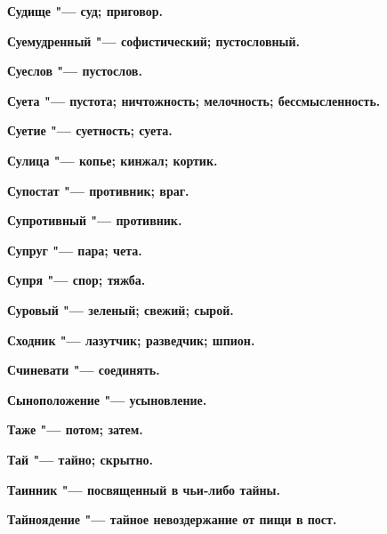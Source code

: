 \bfseries Судище \normalfont{} "--- суд; приговор. 




\bfseries Суемудренный \normalfont{} "--- софистический; пустословный. 




\bfseries Суеслов \normalfont{} "--- пустослов. 




\bfseries Суета \normalfont{} "--- пустота; ничтожность; мелочность; бессмысленность. 




\bfseries Суетие \normalfont{} "--- суетность; суета. 




\bfseries Сулица \normalfont{} "--- копье; кинжал; кортик. 




\bfseries Супостат \normalfont{} "--- противник; враг. 




\bfseries Супротивный \normalfont{} "--- противник. 




\bfseries Супруг \normalfont{} "--- пара; чета. 




\bfseries Супря \normalfont{} "--- спор; тяжба. 




\bfseries Суровый \normalfont{} "--- зеленый; свежий; сырой. 




\bfseries Сходник \normalfont{} "--- лазутчик; разведчик; шпион. 




\bfseries Счиневати \normalfont{} "--- соединять. 




\bfseries Сыноположение \normalfont{} "--- усыновление. 




 





\bfseries Таже \normalfont{} "--- потом; затем. 




\bfseries Тай \normalfont{} "--- тайно; скрытно. 




\bfseries Таинник \normalfont{} "--- посвященный в чьи-либо тайны. 




\bfseries Тайноядение \normalfont{} "--- тайное невоздержание от пищи в пост. 




